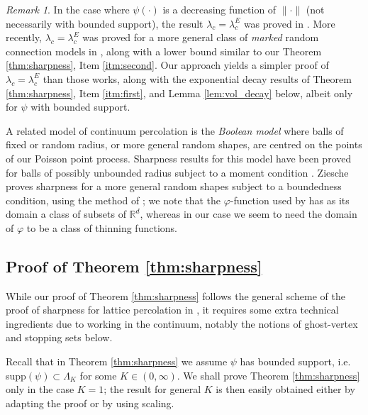 \documentclass[a4paper,12pt]{scrartcl}
\theoremstyle{definition}
\theoremstyle{remark}
\newtheorem{remark}[theorem]{Remark}
\begin{document}
\begin{remark}
  \label{rk:sharpcontext}
  In the case where $\psi(\cdot)$ is a decreasing function of $\|\cdot\|$ (not necessarily with bounded support),
  the result $\lambda_c = \lambda_c^E$ was proved in
  \cite{meester1996continuum}.
  More recently, $\lambda_c = \lambda_c^E$ was proved for
  a more general class of {\em marked} random connection
  models
  in \cite{caicedo2023critical}, along with a lower bound
  similar to our Theorem \ref{thm:sharpness},
  Item \ref{itm:second}. Our approach yields a simpler proof of $\lambda_c= \lambda_c^E$ than those works, along with
  the exponential decay results of Theorem \ref{thm:sharpness},
  Item \ref{itm:first}, and Lemma \ref{lem:vol_decay} below,
  albeit only for $\psi$ with bounded support.

  A related model of continuum percolation is the {\em Boolean model}
  where balls of fixed or random radius, or more general random shapes, are
  centred on the points of our Poisson point process. Sharpness results for this model have been proved for balls of possibly unbounded radius
  subject to a moment condition \cite{dembin2023almost,duminil2020subcritical}.
  Ziesche
  \cite{ziesche} proves sharpness
  for a more general random shapes subject to a boundedness condition, using the method of
  \cite{duminilcopin2015new};
  we note that the $\varphi$-function
  used by \cite{ziesche} has as its domain a class of subsets of $\mathbb R^d$, whereas in our case we seem to need the domain of $\varphi$ to be a class of thinning functions.
\end{remark}

\subsection{Proof of Theorem \ref{thm:sharpness}}
While our proof of Theorem \ref{thm:sharpness} follows the general scheme of
the proof of sharpness for lattice percolation in \cite{duminilcopin2015new},
it  requires some extra technical ingredients due to working in the continuum,
notably the notions of ghost-vertex and stopping sets below.

Recall that in Theorem \ref{thm:sharpness} we assume $\psi$ has bounded support, i.e. supp$(\psi) \subset \Lambda_K$ for some $K \in (0,\infty)$. We shall prove
Theorem \ref{thm:sharpness} only in the case $K=1$; the result for general $K$
is then easily obtained either by adapting the proof or by using scaling.
\end{document}
